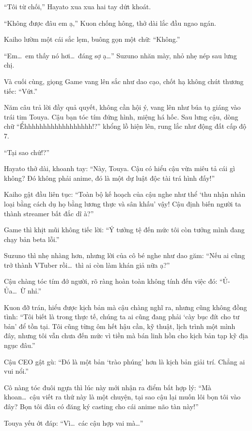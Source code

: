 \documentclass[../main.tex]{subfiles}
\begin{document}
``Tôi từ chối,'' Hayato xua xua hai tay dứt khoát.

``Không được đâu em ạ,'' Kuon chống hông, thở dài lắc đầu ngao ngán.

Kaiho lườm một cái sắc lẹm, buông gọn một chữ: ``Không.''

``Em\dots\ em thấy nó hơi\dots\ đáng sợ ạ\dots'' Suzuno nhăn mày, nhỏ nhẹ nép sau lưng chị.

Và cuối cùng, giọng Game vang lên sắc như dao cạo, chốt hạ không chút thương tiếc: ``Vứt.''

Năm câu trả lời đầy quả quyết, không cần hội ý, vang lên như búa tạ giáng vào trái tim Touya. Cậu bạn tóc tím đứng hình, miệng há hốc. Sau lưng cậu, dòng chữ ``Ểhhhhhhhhhhhhhhhhhh!?'' khổng lồ hiện lên, rung lắc như động đất cấp độ 7.

``Tại sao chứ!?''

Hayato thở dài, khoanh tay: ``Này, Touya. Cậu có hiểu cậu vừa miêu tả cái gì không? Đó không phải anime, đó là một dự luật độc tài trá hình đấy!''

Kaiho gật đầu liên tục: ``Toàn bộ kế hoạch của cậu nghe như thể `thu nhận nhân loại bằng cách dụ họ bằng lương thực và sân khấu' vậy! Cậu định biến người ta thành streamer bất đắc dĩ à?''

Game thì khịt mũi không tiếc lời: ``Ý tưởng tệ đến mức tôi còn tưởng mình đang chạy bản beta lỗi.''

Suzuno thì nhẹ nhàng hơn, nhưng lời của cô bé nghe như dao găm: ``Nếu ai cũng trở thành VTuber rồi\dots\ thì ai còn làm khán giả nữa ạ?''

Cậu chàng tóc tím đớ người, rõ ràng hoàn toàn không tính đến việc đó: ``Ủ-Ủa\dots\ Ừ nhỉ.''

Kuon đỡ trán, hiểu được kịch bản mà cậu chàng nghĩ ra, nhưng cũng không đồng tình: ``Tôi biết là trong thực tế, chúng ta ai cũng đang phải `cày bục đít cho tư bản' để tồn tại. Tôi cũng từng ôm hết hậu cần, kỹ thuật, lịch trình một mình đây, nhưng tôi vẫn chưa đến mức vì tiền mà bán linh hồn cho kịch bản tạp kỹ địa ngục đâu.''

Cậu CEO gật gù: ``Đó là một bản `trào phúng' hơn là kịch bản giải trí. Chẳng ai vui nổi.''

Cô nàng tóc đuôi ngựa thì lúc này mới nhận ra điểm bất hợp lý: ``Mà khoan\dots\ cậu viết ra thứ này là một chuyện, tại sao cậu lại muốn lôi bọn tôi vào đây? Bọn tôi đâu có đăng ký casting cho cái anime não tàn này!''

Touya yếu ớt đáp: ``Vì\dots\ các cậu hợp vai mà\dots''
\end{document}
